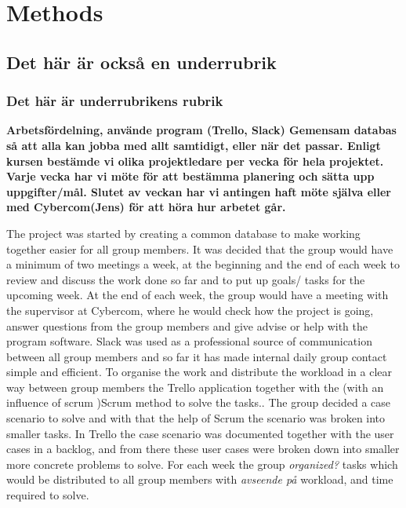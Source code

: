 \section{Methods}
\subsection{Det här är också en underrubrik}
\subsubsection{Det här är underrubrikens rubrik}

\textbf{Arbetsfördelning, använde program (Trello, Slack) 
Gemensam databas så att alla kan jobba med allt samtidigt, eller när det passar.
Enligt kursen bestämde vi olika projektledare per vecka för hela projektet.
Varje vecka har vi möte för att bestämma planering och sätta upp uppgifter/mål.
Slutet av veckan har vi antingen haft möte själva eller med Cybercom(Jens) för att höra hur arbetet går.}
\bigskip 

The project was started by creating a common database to make working together easier for all group members. It was decided that the group would have a minimum of two meetings a week, at the beginning and the end of each week to review and discuss the work done so far and to put up goals/ tasks for the upcoming week. At the end of each week, the group would have a meeting with the supervisor at Cybercom, where he would check how the project is going, answer questions from the group members and give advise or help with the program software. Slack was used as a professional source of communication between all group members and so far it has made internal daily group contact simple and efficient. To organise the work and distribute the workload in a clear way between group members the Trello application together with the (with an influence of scrum )Scrum method to solve the tasks.. The group decided a case scenario to solve and with that the help of Scrum the scenario was broken into smaller tasks. In Trello the case scenario was documented together with the user cases in a backlog, and from there these user cases were broken down into smaller more concrete problems to solve. For each week the group \textit{organized?} tasks which would be distributed to all group members with \textit{avseende på} workload,  and time required to solve.
